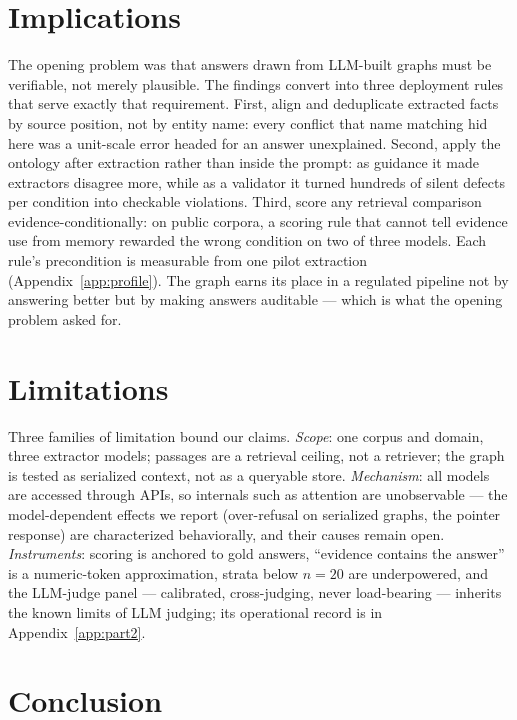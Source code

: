 \documentclass{article}
\begin{document}
\section{Implications}\label{sec:profile}

The opening problem was that answers drawn from LLM-built graphs must be
verifiable, not merely plausible. The findings convert into three
deployment rules that serve exactly that requirement. First, align and
deduplicate extracted facts by source position, not by entity name: every
conflict that name matching hid here was a unit-scale error headed for an
answer unexplained.
Second, apply the ontology after extraction rather than inside the
prompt: as guidance it made extractors disagree more, while as a
validator it turned hundreds of silent defects per condition into
checkable violations. Third, score any retrieval comparison
evidence-conditionally: on public corpora, a scoring rule that cannot
tell evidence use from memory rewarded the wrong condition on two of
three models. Each rule's precondition is measurable from one pilot extraction
(Appendix~\ref{app:profile}). The graph earns its place in a regulated
pipeline not by answering better but by making answers auditable ---
which is what the opening problem asked for.

\section{Limitations}\label{sec:limitations}

Three families of limitation bound our claims. \emph{Scope}: one corpus
and domain, three extractor models; passages are a retrieval ceiling, not
a retriever; the graph is tested as serialized context, not as a queryable
store. \emph{Mechanism}: all models are accessed through APIs, so
internals such as attention are unobservable --- the model-dependent
effects we report (over-refusal on serialized graphs, the pointer
response) are characterized behaviorally, and their causes remain open.
\emph{Instruments}: scoring is anchored to gold answers, ``evidence
contains the answer'' is a numeric-token approximation, strata below
$n{=}20$ are underpowered, and the LLM-judge panel --- calibrated,
cross-judging, never load-bearing --- inherits the known limits of LLM
judging; its operational record is in Appendix~\ref{app:part2}.

\section{Conclusion}\label{sec:conclusion}
\end{document}
